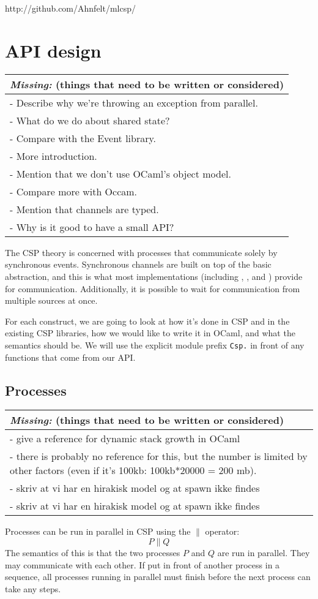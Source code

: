 \documentclass[a4paper,12pt]{article}
\newcommand{\missing}[1]{
  \begin{tabular}{|p{11cm}|}
    \hline
    \emph{Missing:} {\scriptsize (things that need to be written or considered)} \\
    \hline
    #1
    \hline
  \end{tabular}
}
\begin{document}
\begin{center}
http://github.com/Ahnfelt/mlcsp/
\end{center}


\section{API design}
\label{analysis}
\missing{
- Describe why we're throwing an exception from parallel.\\
- What do we do about shared state?\\
- Compare with the Event library.\\
- More introduction.\\
- Mention that we don't use OCaml's object model.\\
- Compare more with Occam.\\
- Mention that channels are typed.\\
- Why is it good to have a small API?\\
}

The CSP theory is concerned with processes that communicate solely by synchronous 
events. Synchronous channels are built on top of the basic abstraction, and this is
what most implementations (including \cite{occam}, \cite{c++csp}, \cite{jcsp} and 
\cite{pycsp}) provide for communication. 
Additionally, it is possible to wait for communication from multiple sources at once.

For each construct, we are going to look at how it's done in CSP and in the 
existing CSP libraries, how we would like to write it in OCaml, and what the 
semantics should be. We will use the explicit module prefix \verb|Csp.| in front
of any functions that come from our API.

\subsection{Processes}
\missing{
- give a reference for dynamic stack growth in OCaml\\
- there is probably no reference for this, but the number is limited by other
factors (even if it's 100kb: 100kb*20000 = 200 mb).\\
- skriv at vi har en hirakisk model og at spawn ikke findes\\
- skriv at vi har en hirakisk model og at spawn ikke findes\\
}

Processes can be run in parallel in CSP using the $\parallel$ operator:
\[P \parallel Q\]
The semantics of this is that the two processes $P$ and $Q$ are run in parallel. They
may communicate with each other. If put in front of another process in a sequence, all
processes running in parallel must finish before the next process can take any steps.
\end{document}
